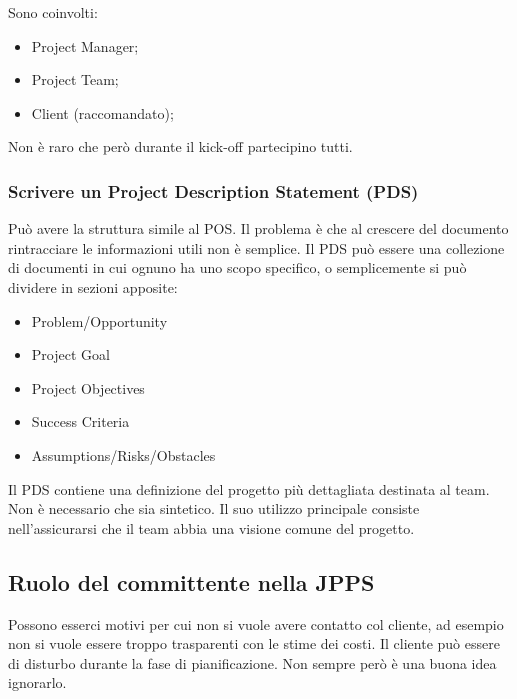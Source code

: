 Sono coinvolti:
\begin{itemize}
	\item Project Manager;
	\item Project Team;
	\item Client (raccomandato);
\end{itemize}
Non è raro che però durante il kick-off partecipino tutti.

\subsubsection{Scrivere un Project Description Statement (PDS)}
Può avere la struttura simile al POS. Il problema è che al crescere del documento rintracciare le informazioni utili non è semplice. Il PDS può essere una collezione di documenti in cui ognuno ha uno scopo specifico, o semplicemente si può dividere in sezioni apposite:
\begin{itemize}
	\item Problem/Opportunity
	\item Project Goal
	\item Project Objectives
	\item Success Criteria
	\item Assumptions/Risks/Obstacles
\end{itemize}
Il PDS contiene una definizione del progetto più dettagliata destinata al team. Non è necessario che sia sintetico. Il suo utilizzo principale consiste nell'assicurarsi che il team abbia una visione comune del progetto.
\subsection{Ruolo del committente nella JPPS}
Possono esserci motivi per cui non si vuole avere contatto col cliente, ad esempio non si vuole essere troppo trasparenti con le stime dei costi. Il cliente può essere di disturbo durante la fase di pianificazione. Non sempre però è una buona idea ignorarlo.


